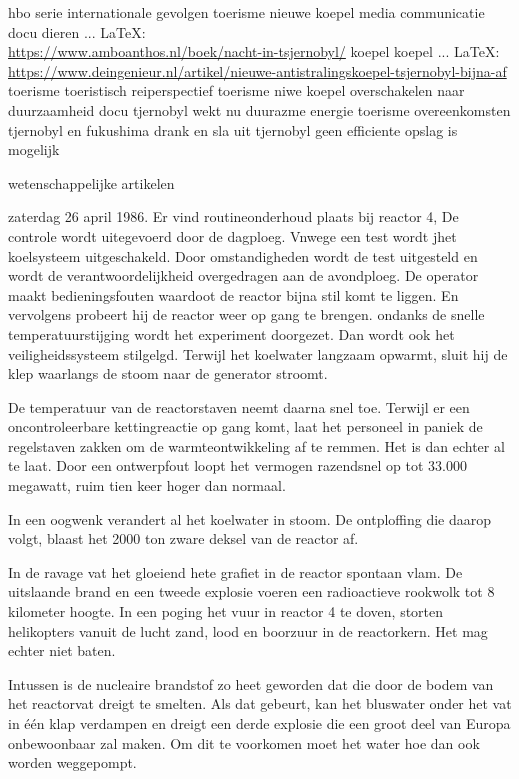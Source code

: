 \begin{thebibliography}{99}
{{{	hbo serie
	internationale gevolgen
	toerisme
	nieuwe koepel
	media communicatie
	docu
	dieren
	 ... \LaTeX:\\ \url{https://www.amboanthos.nl/boek/nacht-in-tsjernobyl/}
	koepel
	koepel
	 ... \LaTeX:\\ \url{https://www.deingenieur.nl/artikel/nieuwe-antistralingskoepel-tsjernobyl-bijna-af}
	toerisme
	toeristisch reiperspectief
	toerisme
	niwe koepel
	overschakelen naar duurzaamheid
	docu
	tjernobyl wekt nu duurazme energie
	toerisme
	overeenkomsten tjernobyl en fukushima
	drank en sla uit tjernobyl
	geen efficiente opslag is mogelijk
	
	wetenschappelijke artikelen
	
	zaterdag 26 april 1986. Er vind routineonderhoud plaats bij reactor 4, De controle wordt uitegevoerd door de dagploeg. Vnwege een test wordt jhet koelsysteem uitgeschakeld. Door omstandigheden wordt de test uitgesteld en wordt de verantwoordelijkheid overgedragen aan de avondploeg.
	De operator maakt bedieningsfouten waardoot de reactor bijna stil komt te liggen. En vervolgens probeert hij de reactor weer op gang te brengen. ondanks de snelle temperatuurstijging wordt het experiment doorgezet. Dan wordt ook het veiligheidssysteem stilgelgd. Terwijl het koelwater langzaam opwarmt, sluit hij de klep waarlangs de stoom naar de generator stroomt.
	
	De temperatuur van de reactorstaven neemt daarna snel toe. Terwijl er een oncontroleerbare kettingreactie op gang komt, laat het personeel in paniek de regelstaven zakken om de warmteontwikkeling af te remmen. Het is dan echter al te laat. Door een ontwerpfout loopt het vermogen razendsnel op tot 33.000 megawatt, ruim tien keer hoger dan normaal.
	
	In een oogwenk verandert al het koelwater in stoom. De ontploffing die daarop volgt, blaast het 2000 ton zware deksel van de reactor af.}

In de ravage vat het gloeiend hete grafiet in de reactor spontaan vlam. De uitslaande brand en een tweede explosie voeren een radioactieve rookwolk tot 8 kilometer hoogte. 
In een poging het vuur in reactor 4 te doven, storten helikopters vanuit de lucht zand, lood en boorzuur in de reactorkern. Het mag echter niet baten.

Intussen is de nucleaire brandstof zo heet geworden dat die door de bodem van het reactorvat dreigt te smelten. Als dat gebeurt, kan het bluswater onder het vat in één klap verdampen en dreigt een derde explosie die een groot deel van Europa onbewoonbaar zal maken. Om dit te voorkomen moet het water hoe dan ook worden weggepompt.

}}
\end{thebibliography}
